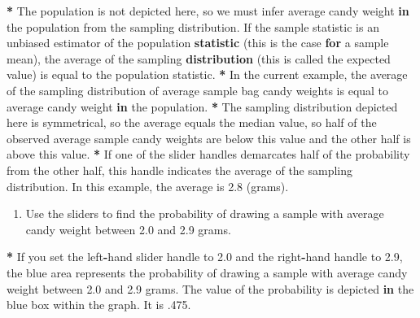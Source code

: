 \documentclass[a4paper]{book}
\newenvironment{Shaded}{\begin{snugshade}}{\end{snugshade}}
\newcommand{\KeywordTok}[1]{\textcolor[rgb]{0,0,0}{\textbf{#1}}}
\newcommand{\DecValTok}[1]{\textcolor[rgb]{0.00,0.00,0.00}{#1}}
\newcommand{\FloatTok}[1]{\textcolor[rgb]{0.00,0.00,0.00}{#1}}
\newcommand{\StringTok}[1]{\textcolor[rgb]{0.00,0.00,0.00}{#1}}
\newcommand{\ControlFlowTok}[1]{\textcolor[rgb]{0.00,0.00,0.00}{\textbf{#1}}}
\newcommand{\OperatorTok}[1]{\textcolor[rgb]{0.00,0.00,0.00}{\textbf{#1}}}
\newcommand{\NormalTok}[1]{#1}
\providecommand{\tightlist}{%
  \setlength{\itemsep}{0pt}\setlength{\parskip}{0pt}}
\theoremstyle{definition}
\theoremstyle{definition}
\theoremstyle{definition}
\theoremstyle{remark}
\begin{document}
\begin{Shaded}
\begin{Highlighting}[]
\OperatorTok{*}\StringTok{ }\NormalTok{The population is not depicted here, so we must infer average candy weight}
\ControlFlowTok{in}\NormalTok{ the population from the sampling distribution. If the sample statistic is}
\NormalTok{an unbiased estimator of the population }\KeywordTok{statistic}\NormalTok{ (this is the case }\ControlFlowTok{for}\NormalTok{ a}
\NormalTok{sample mean), the average of the sampling }\KeywordTok{distribution}\NormalTok{ (this is called the}
\NormalTok{expected value) is equal to the population statistic.}
\OperatorTok{*}\StringTok{ }\NormalTok{In the current example, the average of the sampling distribution of average}
\NormalTok{sample bag candy weights is equal to average candy weight }\ControlFlowTok{in}\NormalTok{ the population.}
\OperatorTok{*}\StringTok{ }\NormalTok{The sampling distribution depicted here is symmetrical, so the average}
\NormalTok{equals the median value, so half of the observed average sample candy weights}
\NormalTok{are below this value and the other half is above this value.}
\OperatorTok{*}\StringTok{ }\NormalTok{If one of the slider handles demarcates half of the probability from the}
\NormalTok{other half, this handle indicates the average of the sampling distribution. In}
\NormalTok{this example, the average is }\FloatTok{2.8}\NormalTok{ (grams).}
\end{Highlighting}
\end{Shaded}

\begin{enumerate}
\def\labelenumi{\arabic{enumi}.}
\setcounter{enumi}{8}
\tightlist
\item
  Use the sliders to find the probability of drawing a sample with
  average candy weight between 2.0 and 2.9 grams.
\end{enumerate}

\begin{Shaded}
\begin{Highlighting}[]
\OperatorTok{*}\StringTok{ }\NormalTok{If you set the left}\OperatorTok{-}\NormalTok{hand slider handle to }\FloatTok{2.0}\NormalTok{ and the right}\OperatorTok{-}\NormalTok{hand handle to}
\FloatTok{2.9}\NormalTok{, the blue area represents the probability of drawing a sample with average}
\NormalTok{candy weight between }\FloatTok{2.0}\NormalTok{ and }\FloatTok{2.9}\NormalTok{ grams. The value of the probability is}
\NormalTok{depicted }\ControlFlowTok{in}\NormalTok{ the blue box within the graph. It is .}\DecValTok{475}\NormalTok{.}
\end{Highlighting}
\end{Shaded}
\end{document}
